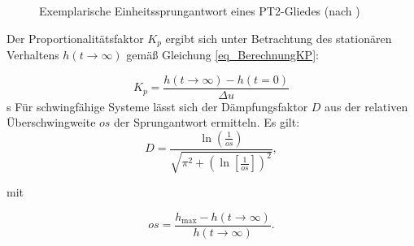 \begin{figure}[h!]
    \centering
    \setlength{\fboxsep}{1pt}
    \setlength{\fboxrule}{1pt}
    \caption[Exemplarische Einheitssprungantwort eines PT2-Gliedes]{Exemplarische Einheitssprungantwort eines PT2-Gliedes (nach \cite[S.60]{ProfMueller})}
    \label{fig_SprungantwortSymbolisch}
\end{figure}

Der Proportionalitätsfaktor $K_p$ ergibt sich unter Betrachtung des stationären Verhaltens $h(t\rightarrow \infty)$ gemäß Gleichung \ref{eq_BerechnungKP}:

\begin{equation} \label{eq_BerechnungKP}
    K_p = \frac{h(t\rightarrow \infty) - h(t=0)}{\Delta u}
\end{equation}
s
Für schwingfähige Systeme lässt sich der Dämpfungsfaktor $D$ aus der relativen Überschwingweite $os$ der Sprungantwort ermitteln.
Es gilt:
\begin{equation} \label{eq_BerechnungD}
    D = \frac{\ln \left(\frac{1}{os}\right)}{\sqrt{\pi^2+\left(\ln\left[\frac{1}{os}\right]\right)^2}},
\end{equation}

\vspace*{-\baselineskip}mit

\begin{equation} \label{eq_overshoot}
    os = \frac{h_{\mathrm{max}}-h(t\rightarrow \infty)}{h(t\rightarrow \infty)}.
\end{equation}

